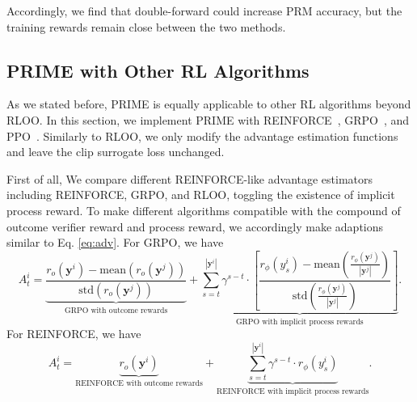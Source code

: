 % 
Accordingly, we find that double-forward could increase PRM accuracy, but the training rewards remain close between the two methods. %




\subsection{PRIME with Other RL Algorithms}
\label{sec:other_algo}
As we stated before, PRIME is equally applicable to other RL algorithms beyond RLOO.
In this section, we implement PRIME with REINFORCE~\citep{williams1992simple}, GRPO~\citep{deepseek-math}, and PPO~\citep{schulman2017proximal}. Similarly to RLOO, we only modify the advantage estimation functions and leave the clip surrogate loss unchanged. 


First of all, We compare different REINFORCE-like advantage estimators including REINFORCE, GRPO, and RLOO, toggling the existence of implicit process reward. To make different algorithms compatible with the compound of outcome verifier reward and process reward, we accordingly make adaptions similar to Eq. \ref{eq:adv}. For GRPO, we have
\begin{equation}
        A^i_t = \underbrace{\frac{r_{o}\left(\mathbf{y}^i\right)-\text{mean}( r_o\left(\mathbf{y}^j\right))}{\text{std}( r_o\left(\mathbf{y}^j\right))}}_\text{GRPO with outcome rewards} + \underbrace{\sum_{s=t}^{|\mathbf{y}^i|} \gamma^{s-t} \cdot \left[\frac{r_\phi(y^i_s)-\text{mean}\left(\frac{r_\phi \left(\mathbf{y}^j\right)}{|\mathbf{y}^j|}\right)}{\text{std}\left(\frac{r_\phi \left(\mathbf{y}^j\right)}{|\mathbf{y}^j|}\right)}\right]}_\text{GRPO with implicit process rewards}.
\end{equation}
For REINFORCE, we have
\begin{equation}
A^i_t = \underbrace{r_o\left(\mathbf{y}^i\right)}_\text{REINFORCE with outcome rewards} + \underbrace{\sum_{s=t}^{|\mathbf{y}^i|} \gamma^{s-t} \cdot r_\phi(y^i_s)}_\text{REINFORCE with implicit process rewards}.
\end{equation}

